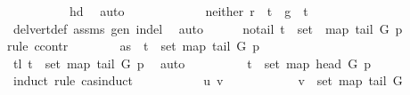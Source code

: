 \begin{isabellebody}
\ \ \ \ \ \ \ \ \ \ hd\ \isamarkupfalse%
\ auto\ \ \isanewline
\ \ \ \ \isamarkupfalse%
\isanewline
\ \ \ \ \isamarkupfalse%
\ neither{\isacharcolon}{\kern0pt}\ {\isachardoublequoteopen}r\ {\isasymnoteq}\ t\ {\isasymand}\ g\ {\isasymnoteq}\ t{\isachardoublequoteclose}\isanewline
\ \ \ \ \ \ \isamarkupfalse%
\ del{\isacharunderscore}{\kern0pt}vert{\isacharunderscore}{\kern0pt}def\ assms{\isacharparenleft}{\kern0pt}{}{\isacharparenright}{\kern0pt}\ gen\ in{\isacharunderscore}{\kern0pt}del\ \isamarkupfalse%
\ auto\isanewline
\ \ \ \ \isamarkupfalse%
\ no{\isacharunderscore}{\kern0pt}tail{\isacharcolon}{\kern0pt}\ {\isachardoublequoteopen}t\ {\isasymnotin}\ {\isacharparenleft}{\kern0pt}set\ {\isacharparenleft}{\kern0pt}\ map\ {\isacharparenleft}{\kern0pt}tail\ G{\isacharparenright}{\kern0pt}\ p{\isacharparenright}{\kern0pt}{\isacharparenright}{\kern0pt}{\isachardoublequoteclose}\isanewline
\ \ \ \ \isamarkupfalse%
{\isacharparenleft}{\kern0pt}rule\ ccontr{\isacharparenright}{\kern0pt}\isanewline
\ \ \ \ \ \ \isamarkupfalse%
\ as{}{\isacharcolon}{\kern0pt}\ {\isachardoublequoteopen}{\isasymnot}\ t\ {\isasymnotin}\ set\ {\isacharparenleft}{\kern0pt}map\ {\isacharparenleft}{\kern0pt}tail\ G{\isacharparenright}{\kern0pt}\ p{\isacharparenright}{\kern0pt}{\isachardoublequoteclose}\isanewline
\ \ \ \ \ \ \isamarkupfalse%
\ \isamarkupfalse%
\ tl{}{\isacharcolon}{\kern0pt}\ {\isachardoublequoteopen}t\ {\isasymin}\ set\ {\isacharparenleft}{\kern0pt}map\ {\isacharparenleft}{\kern0pt}tail\ G{\isacharparenright}{\kern0pt}\ p{\isacharparenright}{\kern0pt}{\isachardoublequoteclose}\ \isamarkupfalse%
\ auto\isanewline
\ \ \ \ \ \ \isamarkupfalse%
\ \isamarkupfalse%
\ {\isachardoublequoteopen}t\ {\isasymin}\ set\ {\isacharparenleft}{\kern0pt}map\ {\isacharparenleft}{\kern0pt}head\ G{\isacharparenright}{\kern0pt}\ p{\isacharparenright}{\kern0pt}{\isachardoublequoteclose}\isanewline
\ \ \ \ \ \ \isamarkupfalse%
\ {\isacharparenleft}{\kern0pt}induct\ rule{\isacharcolon}{\kern0pt}\ cas{\isachardot}{\kern0pt}induct{\isacharparenright}{\kern0pt}\isanewline
\ \ \ \ \ \ \ \ \isamarkupfalse%
\ {\isacharparenleft}{\kern0pt}{}\ u\ v{\isacharparenright}{\kern0pt}\isanewline
\ \ \ \ \ \ \ \ \isamarkupfalse%
\ \isamarkupfalse%
\ {\isachardoublequoteopen}v\ {\isasymnotin}\ set\ {\isacharparenleft}{\kern0pt}map\ {\isacharparenleft}{\kern0pt}tail\ G{\isacharparenright}{\kern0pt}\ {\isacharbrackleft}{\kern0pt}{\isacharbrackright}{\kern0pt}{\isacharparenright}{\kern0pt}{\isachardoublequoteclose}\ \isamarkupfalse%

\end{isabellebody}
